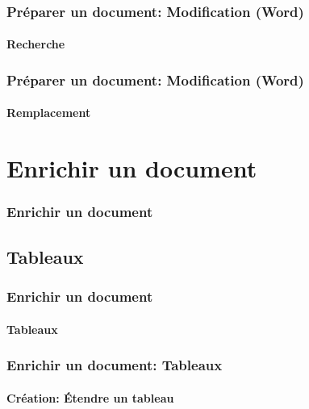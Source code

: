 \documentclass[xcolor=table]{beamer}
\begin{document}
\begin{frame}
\frametitle{Préparer un document: Modification (Word)}
\framesubtitle{Recherche}

\begin{minipage}{0.58\textwidth}
\end{minipage}
\begin{minipage}{0.4\textwidth}
\end{minipage}

\end{frame}

\begin{frame}
\frametitle{Préparer un document: Modification (Word)}
\framesubtitle{Remplacement}

\end{frame}

\section{Enrichir un document}

\begin{frame}
\frametitle{Enrichir un document}

\end{frame}

\subsection{Tableaux}

\begin{frame}
\frametitle{Enrichir un document}
\framesubtitle{Tableaux}

\end{frame}

\begin{frame}
\frametitle{Enrichir un document: Tableaux}
\framesubtitle{Création: Étendre un tableau}

\end{frame}
\end{document}
